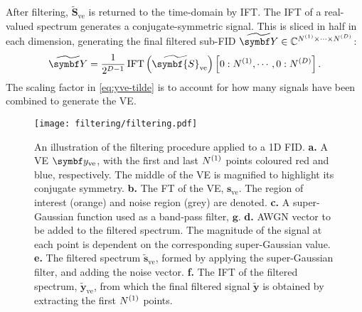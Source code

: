 After filtering, $\widetilde{\symbf{S}}_{\text{ve}}$ is returned to the
time-domain by \ac{IFT}. The \ac{IFT} of a real-valued spectrum generates a
conjugate-symmetric signal. This is sliced in half in each dimension,
generating the final filtered sub-FID $\widetilde{\bY} \in
\mathbb{C}^{\None \times \cdots \times \ND}$:
\begin{equation}
    \widetilde{\bY} =
        \frac{1}{2^{D-1}}
        \IFT\left(\widetilde{\symbf{S}}_{\text{ve}}\right)
        \left[0:\None, \cdots, 0:\ND\right].
        \label{eq:yve-tilde}
\end{equation}
The scaling factor in \eqref{eq:yve-tilde} is to account for how many signals
have been combined to generate the \ac{VE}.

\begin{figure}
     \centering
     \texttt{[image: filtering/filtering.pdf]}
     \caption[
         An illustration of the filtering procedure applied to a \acs{1D}
         \acs{FID}.
     ]{
         An illustration of the filtering procedure applied to a \ac{1D}
         \ac{FID}.
         \textbf{a.} A \ac{VE} $\by_{\text{ve}}$, with the first and last
         $N^{(1)}$ points coloured red and blue, respectively. The middle of the
         \ac{VE} is magnified to highlight its conjugate symmetry.
         \textbf{b.} The \ac{FT} of the \ac{VE}, $\symbf{s}_{\text{ve}}$.
         The region of interest (orange) and noise region (grey) are denoted.
         \textbf{c.} A super-Gaussian function used as a band-pass filter,
         $\symbf{g}$.
         \textbf{d.} \acs{AWGN} vector to be added to the filtered spectrum.
         The magnitude of the signal at each point is dependent on the
         corresponding super-Gaussian value.
         \textbf{e.} The filtered spectrum $\widetilde{\symbf{s}}_{\text{ve}}$,
         formed by applying the super-Gaussian filter, and adding the noise
         vector.
         \textbf{f.} The \ac{IFT} of the filtered spectrum,
         $\widetilde{\symbf{y}}_{\text{ve}}$, from which the final filtered
         signal $\widetilde{\symbf{y}}$ is obtained by extracting
         the first $N^{(1)}$ points.
     }
     \label{fig:filtering}
\end{figure}

